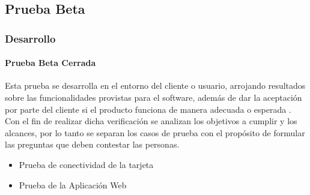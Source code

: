 \subsection{Prueba Beta}

\begin{frame}[t]
\frametitle{Desarrollo}
\framesubtitle{Prueba Beta Cerrada}

Esta prueba se desarrolla en el entorno del cliente o usuario, arrojando resultados sobre las funcionalidades provistas para el software, además de dar la aceptación por parte del cliente si el producto funciona de manera adecuada o esperada \cite{PB}. Con el fin de realizar dicha verificación se analizan los objetivos a cumplir y los alcances, por lo tanto se separan los casos de prueba con el propósito de formular las preguntas que deben contestar las personas.\newline

\begin{itemize}

\item Prueba de conectividad de la tarjeta

\item Prueba de la Aplicación Web
\end{itemize}

\end{frame}